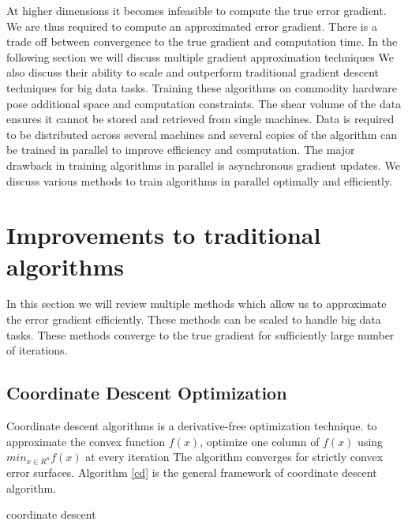 \documentclass[sigconf]{acmart}
\begin{document}
At higher dimensions it becomes infeasible to compute the true error gradient. We are thus required to compute an approximated error gradient. There is a trade off between convergence to the true gradient and computation time. In the following section we will discuss multiple gradient approximation techniques We also discuss their ability to scale and outperform traditional gradient descent techniques for big data tasks. Training these algorithms on commodity hardware pose additional space and computation constraints. The shear volume of the data ensures it cannot be stored and retrieved from single machines. Data is required to be distributed across several machines and several copies of the algorithm can be trained in parallel to improve efficiency and computation. The major drawback in training algorithms in parallel is asynchronous gradient updates. We discuss various methods to train algorithms in parallel optimally and efficiently.

\section{Improvements to traditional algorithms} \label{improve}

In this section we will review multiple methods which allow us to approximate the error gradient efficiently. These methods can be scaled to handle big data tasks. These methods converge to the true gradient for sufficiently large number of iterations.


\subsection{Coordinate Descent Optimization}

Coordinate descent algorithms \cite{Wright} is a derivative-free optimization technique. to approximate the convex function $f(x)$, optimize one column of $f(x)$ using $ min_{x \in R^n } f(x)$ at every iteration The algorithm converges for strictly convex error surfaces. Algorithm \ref{cd} is the general framework of coordinate descent algorithm. 

\begin{algorithm}

\caption{coordinate descent} \label{cd}

\begin{algorithmic}[1] 
\EndFor
\end{algorithmic}

\end{algorithm}
\end{document}
